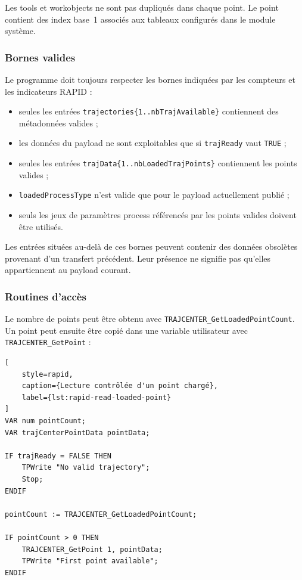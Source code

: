 \documentclass{rapportENSAM}
\begin{document}
Les tools et workobjects ne sont pas dupliqués dans chaque point. Le point
contient des index base~1 associés aux tableaux configurés dans le module
système.


\subsubsection{Bornes valides}
\label{subsubsec:rapid-valid-data-ranges}

Le programme doit toujours respecter les bornes indiquées par les compteurs et
les indicateurs RAPID :

\begin{itemize}
    \item seules les entrées
    \texttt{trajectories\{1..nbTrajAvailable\}} contiennent des métadonnées
    valides ;
    \item les données du payload ne sont exploitables que si
    \texttt{trajReady} vaut \texttt{TRUE} ;
    \item seules les entrées
    \texttt{trajData\{1..nbLoadedTrajPoints\}} contiennent les points valides ;
    \item \texttt{loadedProcessType} n'est valide que pour le payload
    actuellement publié ;
    \item seuls les jeux de paramètres process référencés par les points valides
    doivent être utilisés.
\end{itemize}

Les entrées situées au-delà de ces bornes peuvent contenir des données
obsolètes provenant d'un transfert précédent. Leur présence ne signifie pas
qu'elles appartiennent au payload courant.


\subsubsection{Routines d'accès}
\label{subsubsec:rapid-data-access}

Le nombre de points peut être obtenu avec
\texttt{TRAJCENTER\_GetLoadedPointCount}. Un point peut ensuite être copié dans
une variable utilisateur avec \texttt{TRAJCENTER\_GetPoint} :

\begin{lstlisting}[
    style=rapid,
    caption={Lecture contrôlée d'un point chargé},
    label={lst:rapid-read-loaded-point}
]
VAR num pointCount;
VAR trajCenterPointData pointData;

IF trajReady = FALSE THEN
    TPWrite "No valid trajectory";
    Stop;
ENDIF

pointCount := TRAJCENTER_GetLoadedPointCount;

IF pointCount > 0 THEN
    TRAJCENTER_GetPoint 1, pointData;
    TPWrite "First point available";
ENDIF
\end{lstlisting}
\end{document}
